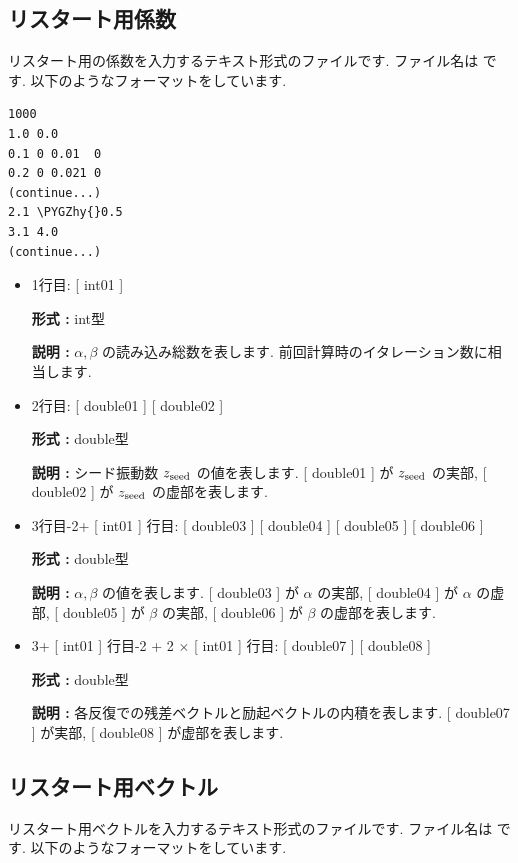 \documentclass[letterpaper,10pt,dvipdfmx,openany]{sphinxmanual}
\def\PYGZhy{\char`\-}
\begin{document}
\subsection{リスタート用係数}
\label{shiftk_format_ja:id4}\label{shiftk_format_ja:recoeff}
リスタート用の係数を入力するテキスト形式のファイルです.
ファイル名は  です.
以下のようなフォーマットをしています.

\begin{Verbatim}[commandchars=\\\{\}]
1000
1.0 0.0
0.1 0 0.01  0
0.2 0 0.021 0
(continue...)
2.1 \PYGZhy{}0.5
3.1 4.0
(continue...)
\end{Verbatim}
\begin{itemize}
\item {} 
1行目: {[} int01 {]}

\textbf{形式 :} int型

\textbf{説明 :}
\(\alpha, \beta\) の読み込み総数を表します. 前回計算時のイタレーション数に相当します.

\item {} 
2行目: {[} double01 {]} {[} double02 {]}

\textbf{形式 :} double型

\textbf{説明 :} シード振動数 \(z_{\rm seed}\) の値を表します.
{[} double01 {]} が \(z_{\rm seed}\) の実部,
{[} double02 {]} が \(z_{\rm seed}\) の虚部を表します.

\item {} 
3行目-2+ {[} int01 {]} 行目:
{[} double03 {]} {[} double04 {]} {[} double05 {]} {[} double06 {]}

\textbf{形式 :} double型

\textbf{説明 :} \(\alpha, \beta\) の値を表します.
{[} double03 {]} が \(\alpha\) の実部, {[} double04 {]} が \(\alpha\) の虚部,
{[} double05 {]} が \(\beta\) の実部, {[} double06 {]} が \(\beta\) の虚部を表します.

\item {} 
3+ {[} int01 {]} 行目-2 + 2 \(\times\) {[} int01 {]} 行目:
{[} double07 {]} {[} double08 {]}

\textbf{形式 :} double型

\textbf{説明 :} 各反復での残差ベクトルと励起ベクトルの内積を表します.
{[} double07 {]} が実部, {[} double08 {]} が虚部を表します.

\end{itemize}


\subsection{リスタート用ベクトル}
\label{shiftk_format_ja:id5}\label{shiftk_format_ja:revec}
リスタート用ベクトルを入力するテキスト形式のファイルです.
ファイル名は  です.
以下のようなフォーマットをしています.
\end{document}
